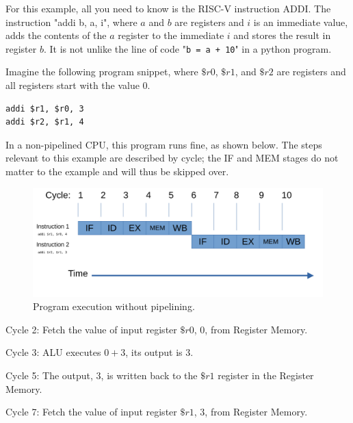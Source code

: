 \documentclass[12pt,twoside]{reedthesis}
\begin{document}
For this example, all you need to know is the RISC-V instruction ADDI. The instruction "addi b, a, i", where $a$ and $b$ are registers and $i$ is an immediate value, adds the contents of the $a$ register to the immediate $i$ and stores the result in register $b$. It is not unlike the line of code "\texttt{b = a + 10}" in a python program.

Imagine the following program snippet, where $\$r0$, $\$r1$, and $\$r2$ are registers and all registers start with the value 0.

\begin{verbatim}
addi $r1, $r0, 3
addi $r2, $r1, 4
\end{verbatim}

In a non-pipelined CPU, this program runs fine, as shown below. The steps relevant to this example are described by cycle; the IF and MEM stages do not matter to the example and will thus be skipped over.


\begin{figure}[h!]

	\centering
	\includegraphics[scale=0.7]{nopipeline}
	\caption{Program execution without pipelining.}
	\label{no-pipeline}
\end{figure}

Cycle 2: Fetch the value of input register $\$r0$, $0$, from Register Memory.

Cycle 3: ALU executes $0 + 3$, its output is $3$.

Cycle 5: The output, $3$, is written back to the $\$r1$ register in the Register Memory.

Cycle 7: Fetch the value of input register $\$r1$, $3$, from Register Memory.
\end{document}
